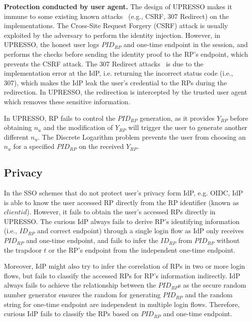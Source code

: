 \vspace{1mm}\noindent\textbf{Protection conducted by user agent.} The design of UPRESSO makes it immune to some existing known attacks~\cite{FettKS16} (e.g., CSRF, 307 Redirect) on the implementations. The Cross-Site Request Forgery (CSRF) attack is  usually exploited by the adversary to perform the identity injection. However, in UPRESSO, the honest user logs  $PID_{RP}$ and one-time endpoint in the session,  and performs the checks before sending the identity proof to the RP's endpoint, which prevents the CSRF attack. The 307 Redirect attacks~\cite{FettKS16} is due to the implementation error at the IdP, i.e. returning the incorrect status code (i.e., 307), which makes the IdP leak the user's credential to the RPs during the redirection. In UPRESSO, the redirection is intercepted by the trusted user agent which removes these sensitive information.

In UPRESSO, RP fails to control the $PID_{RP}$ generation, as it provides $Y_{RP}$ before obtaining $n_{u}$ and the modification of $Y_{RP}$ will trigger the user to generate another different  $n_{u}$. The Discrete Logarithm problem prevents the user from choosing an $n_{u}$ for a specified $PID_{RP}$ on the received $Y_{RP}$.

\subsection{Privacy}
\label{subsec:privacy}
In the SSO schemes that do not protect user's privacy form IdP, e.g. OIDC, IdP is able to know the user accessed RP directly from the RP identifier (known as $client id$). However, it fails to obtain the user's accessed RPs directly in UPRESSO. The curious IdP always fails to derive RP's identifying information (i.e., $ID_{RP}$ and correct endpoint) through a single login flow as IdP only receives $PID_{RP}$ and one-time endpoint, and fails to infer the $ID_{RP}$ from $PID_{RP}$ without the  trapdoor $t$
or the RP's endpoint from the independent one-time endpoint.

Moreover, IdP might also try to infer the correlation of RPs in two or more login flows, but fails to classify the accessed RPs for RP's information indirectly. IdP always fails to achieve the relationship between the $PID_{RP}$s as the secure random number generator ensures the random for generating $PID_{RP}$ and the random string for one-time endpoint are independent in multiple login flows. Therefore, curious IdP fails to classify the RPs based on $PID_{RP}$ and one-time endpoint.

